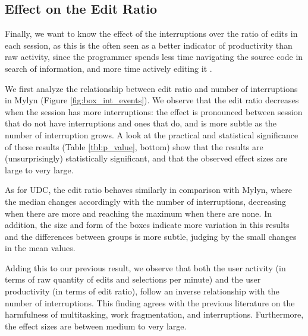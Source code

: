 \documentclass[times]{smrauth}
\begin{document}
\subsection{Effect on the Edit Ratio}
Finally, we want to know the effect of the interruptions over the ratio of edits in each session, as this is the often seen as a better indicator of productivity than raw activity, since the programmer spends less time navigating the source code in search of information, and more time actively editing it \cite{KM06}.

We first analyze the relationship between edit ratio and number of interruptions in Mylyn (Figure \ref{fig:box_int_events}). We observe that the edit ratio decreases when the session has more interruptions: the effect is pronounced between session that do not have interruptions and ones that do, and is more subtle as the number of interruption grows. A look at the practical and statistical significance of these results (Table \ref{tbl:p_value}, bottom) show that the results are (unsurprisingly) statistically significant, and that the observed effect sizes are large to very large.

As for UDC, the edit ratio behaves similarly in comparison with Mylyn, where the median changes accordingly with the number of interruptions, decreasing when there are more and reaching the maximum when there are none. In addition, the size and form of the boxes indicate more variation in this results and the differences between groups is more subtle, judging by the small changes in the mean values.

Adding this to our previous result, we observe that both the user activity (in terms of raw quantity of edits and selections per minute) and the user productivity (in terms of edit ratio), follow an inverse relationship with the number of interruptions. This finding agrees with the previous literature on the harmfulness of multitasking, work fragmentation, and interruptions. Furthermore, the effect sizes are between medium to very large.

\end{document}
